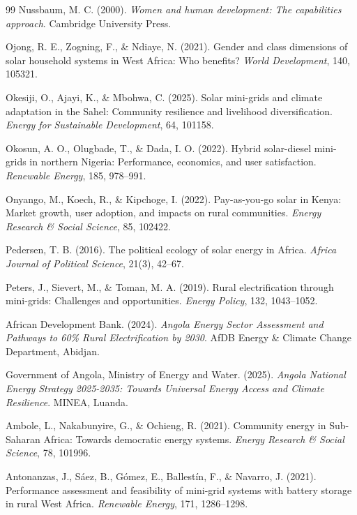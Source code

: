 \documentclass[12pt, a4paper]{article}
\begin{document}
\begin{thebibliography}{99}
 Nussbaum, M. C. (2000). \textit{Women and human development: The capabilities approach}. Cambridge University Press.

 Ojong, R. E., Zogning, F., \& Ndiaye, N. (2021). Gender and class dimensions of solar household systems in West Africa: Who benefits? \textit{World Development}, 140, 105321.

 Okesiji, O., Ajayi, K., \& Mbohwa, C. (2025). Solar mini-grids and climate adaptation in the Sahel: Community resilience and livelihood diversification. \textit{Energy for Sustainable Development}, 64, 101158.

 Okosun, A. O., Olugbade, T., \& Dada, I. O. (2022). Hybrid solar-diesel mini-grids in northern Nigeria: Performance, economics, and user satisfaction. \textit{Renewable Energy}, 185, 978--991.

 Onyango, M., Koech, R., \& Kipchoge, I. (2022). Pay-as-you-go solar in Kenya: Market growth, user adoption, and impacts on rural communities. \textit{Energy Research \& Social Science}, 85, 102422.

 Pedersen, T. B. (2016). The political ecology of solar energy in Africa. \textit{Africa Journal of Political Science}, 21(3), 42--67.

 Peters, J., Sievert, M., \& Toman, M. A. (2019). Rural electrification through mini-grids: Challenges and opportunities. \textit{Energy Policy}, 132, 1043--1052.

 African Development Bank. (2024). \textit{Angola Energy Sector Assessment and Pathways to 60\% Rural Electrification by 2030}. AfDB Energy \& Climate Change Department, Abidjan.

 Government of Angola, Ministry of Energy and Water. (2025). \textit{Angola National Energy Strategy 2025-2035: Towards Universal Energy Access and Climate Resilience}. MINEA, Luanda.

 Ambole, L., Nakabunyire, G., \& Ochieng, R. (2021). Community energy in Sub-Saharan Africa: Towards democratic energy systems. \textit{Energy Research \& Social Science}, 78, 101996.

 Antonanzas, J., Sáez, B., Gómez, E., Ballestín, F., \& Navarro, J. (2021). Performance assessment and feasibility of mini-grid systems with battery storage in rural West Africa. \textit{Renewable Energy}, 171, 1286--1298.


\end{thebibliography}
\end{document}
